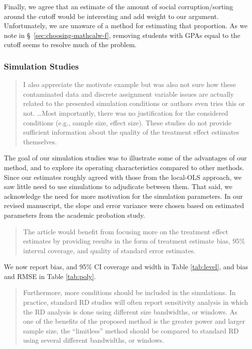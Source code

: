 \documentclass[12pt]{article}
\begin{document}
Finally, we agree that an estimate of the amount of social
corruption/sorting around the cutoff would be interesting and add
weight to our argument. Unfortunately, we are unaware of a method for
estimating that proportion. As we note in \S~\ref{sec:choosing-mathcalw-f}, removing
students with GPAs equal to the cutoff seems to resolve much of the
problem.



\subsubsection{ Simulation Studies}

\begin{quote}
I also appreciate the motivate example but was also not sure how these
contaminated data and discrete assignment variable issues are actually
related to the presented simulation conditions or authors even tries
this or not. \dots Most importantly, there was no justification for the considered
conditions (e.g., sample size, effect size). These studies do not
provide sufficient information about the quality of the treatment
effect estimates themselves.
\end{quote}

The goal of our simulation studies was to illustrate some of the
advantages of our method, and to explore its operating characteristics
compared to other methods. Since our estimates roughly agreed with
those from the local-OLS approach, we saw little need to use
simulations to adjudicate between them. That said, we acknowledge the
need for more motivation for the simulation parameters. In our revised
manuscript, the slope and error variance were chosen based on
estimated parameters from the academic probation study.

\begin{quote}
The article would benefit from focusing more on the treatment effect
estimates by providing results in the form of treatment estimate bias,
95\% interval coverage, and quality of standard error estimates.
\end{quote}
We now report bias, and 95\% CI coverage and width in Table \ref{tab:level}, and
bias and RMSE in Table \ref{tab:poly}.

\begin{quote}
Furthermore, more conditions should be included in the simulations. In
practice, standard RD studies will often report sensitivity analysis
in which the RD analysis is done using different size bandwidths, or
windows. As one of the benefits of the proposed method is the greater
power and larger sample size, the “limitless” method should be
compared to standard RD using several different bandwidths, or
windows.
\end{quote}
\end{document}
